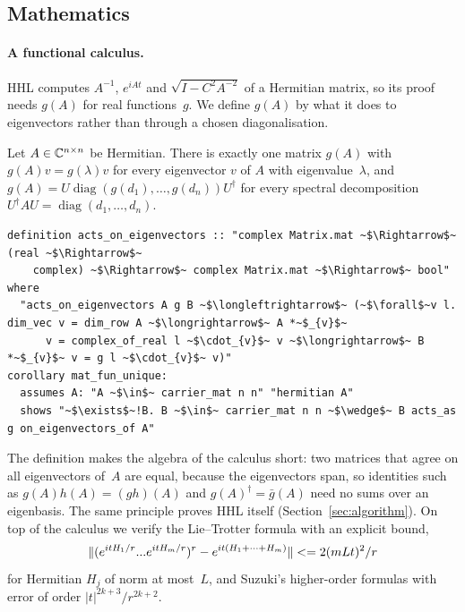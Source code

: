\subsection{Mathematics}\label{sec:math}

\paragraph{A functional calculus.} HHL computes $A^{-1}$, $e^{iAt}$ and $\sqrt{I-C^2A^{-2}}$ of a
Hermitian matrix, so its proof needs $g(A)$ for real functions~$g$. We define $g(A)$ by what it does
to eigenvectors rather than through a chosen diagonalisation.

\begin{theorem}\label{thm:matfun}
Let $A\in\mathbb{C}^{n\times n}$ be Hermitian. There is exactly one matrix $g(A)$ with $g(A)v=g(\lambda)v$ for
every eigenvector $v$ of $A$ with eigenvalue~$\lambda$, and $g(A)=U\operatorname{diag}(g(d_1),\dots,g(d_n))
U^\dagger$ for every spectral decomposition $U^\dagger AU=\operatorname{diag}(d_1,\dots,d_n)$.
\end{theorem}

\begin{lstlisting}[float=tp,caption={The functional calculus: \isa{B acts\_as g on\_eigenvectors\_of A} is notation for \isa{acts\_on\_eigenvectors A g B}, and \isa{mat\_fun g A} is the unique such \isa{B}},label={lst:matfun}]
definition acts_on_eigenvectors :: "complex Matrix.mat ~$\Rightarrow$~ (real ~$\Rightarrow$~
    complex) ~$\Rightarrow$~ complex Matrix.mat ~$\Rightarrow$~ bool" where
  "acts_on_eigenvectors A g B ~$\longleftrightarrow$~ (~$\forall$~v l. dim_vec v = dim_row A ~$\longrightarrow$~ A *~$_{v}$~
      v = complex_of_real l ~$\cdot_{v}$~ v ~$\longrightarrow$~ B *~$_{v}$~ v = g l ~$\cdot_{v}$~ v)"
corollary mat_fun_unique:
  assumes A: "A ~$\in$~ carrier_mat n n" "hermitian A"
  shows "~$\exists$~!B. B ~$\in$~ carrier_mat n n ~$\wedge$~ B acts_as g on_eigenvectors_of A"
\end{lstlisting}

The definition makes the algebra of the calculus short: two matrices that agree on all
eigenvectors of~$A$ are equal, because the eigenvectors span, so identities such as
$g(A)h(A)=(gh)(A)$ and $g(A)^\dagger=\bar g(A)$ need no sums over an eigenbasis. The same principle
proves HHL itself (Section~\ref{sec:algorithm}). On top of the calculus we verify the Lie--Trotter
formula with an explicit bound,
\[
\|(e^{itH_1/r}... e^{itH_m/r})^r-e^{it(H_1+\dots+H_m)}\|<=2(mLt)^2/r
\]
for Hermitian $H_j$ of norm at most~$L$, and Suzuki's higher-order formulas with error of order
$|t|^{2k+3}/r^{2k+2}$.

